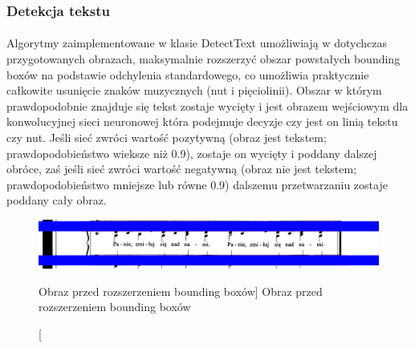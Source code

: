 \documentclass[a4paper,12pt]{article}
\begin{document}
		\subsubsection{Detekcja tekstu} 		
			\paragraph{\indent} Algorytmy zaimplementowane w klasie DetectText umożliwiają w              dotychczas przygotowanych obrazach, maksymalnie rozszerzyć obszar           powstałych bounding boxów na podstawie odchylenia standardowego, co       umożliwia praktycznie całkowite usunięcie znaków muzycznych (nut i        pięciolinii). Obszar w którym prawdopodobnie znajduje się tekst zostaje     wycięty i jest obrazem wejściowym dla konwolucyjnej sieci neuronowej        która podejmuje decyzje czy jest on linią tekstu czy nut. Jeśli sieć        zwróci wartość pozytywną (obraz jest tekstem; prawdopodobieństwo wieksze     niż 0.9), zostaje on wycięty i poddany dalszej obróce, zaś jeśli sieć       zwróci wartość negatywną (obraz nie jest tekstem; prawdopodobieństwo        mniejsze lub równe 0.9) dalszemu przetwarzaniu zostaje poddany cały         obraz.  

			    \begin{figure}[!ht]  
			        \begin{center}
				        \includegraphics[width=16.5cm, frame] {image//exampleImage//005_a.png} 
			        \end{center}
			        \caption
    			        [Obraz przed rozszerzeniem bounding boxów]  
    			        {Obraz przed rozszerzeniem bounding boxów}  
		        \end{figure} 
		
\end{document}
